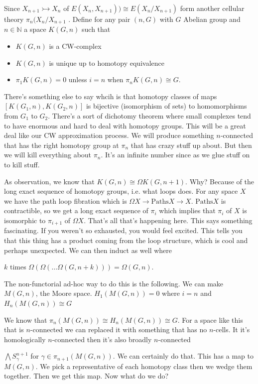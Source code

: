 \documentclass[10pt]{article}
\theoremstyle{definition}
\begin{document}
Since $X_{n+1}\rightarrowtail X_n$ of $E(X_n,X_{n+1}))\cong E(X_n/X_{n+1})$ form another cellular theory $\pi_n(X_n/X_{n+1}$ . Define for any pair $(n,G)$ with $G$ Abelian group and $n\in \mathbb{N}$ a space $K(G,n)$ such that \begin{itemize}
	\item $K(G,n)$ is a CW-complex
	\item $K(G,n)$ is unique up to homotopy equivalence
	\item $\pi_1K(G,n)=0$ unless $i=n$ when $\pi_n K(G,n)\cong G$. 
\end{itemize}
There's something else to say whcih is that homotopy classes of maps $[K(G_1,n),K(G_2,n)]$ is bijective (isomorphism of sets) to homomorphisms from $G_1$ to $G_2$. There's a sort of dichotomy theorem where small complexes tend to have enormous and hard to deal with homotopy groups. This will be a great deal like our CW approximation process. We will produce something $n$-connected that has the right homotopy group at $\pi_n$ that has crazy stuff up about. But then we will kill everything about $\pi_n$. It's an infinite number since as we glue stuff on to kill stuff.

As observation, we know that $K(G,n)\cong \Omega K(G,n+1)$. Why? Because of the long exact sequence of homotopy groups, i.e. what loops does. For any space $X$ we have the path loop fibration which is $\Omega X\to \text{Paths} X\to X$. $\text{Paths} X$ is contractible, so we get a long exact sequence of $\pi_i$ which implies that $\pi_i$ of $X$ is isomorphic to $\pi_{i+1}$ of $\Omega X$. That's all that's happening here. This says something fascinating. If you weren't so exhausted, you would feel excited. This tells you that this thing has a product coming from the loop structure, which is cool and perhaps unexpected. 
We can then induct as well where

$k$ times $\Omega(\Omega(\dots \Omega(G,n+k)))=\Omega(G,n)$. 

The non-functorial ad-hoc way to do this is the following. We can make $M(G,n)$, the Moore space. $H_1(M(G,n))=0$ where $i=n$ and $H_n(M(G,n))\cong G$

We know that $\pi_n(M(G,n))\cong H_n(M(G,n))\cong G$. For a space like this that is $n$-connected we can replaced it with something that has no $n$-cells. It it's homologically $n$-connected then it's also broadly $n$-connected

$\bigwedge S_\gamma^{n+1}$ for $\gamma\in \pi_{n+1}(M(G,n))$. We can certainly do that. This has a map to $M(G,n)$. We pick a representative of each homotopy class then we wedge them together. Then we get this map. Now what do we do? 
\end{document}
